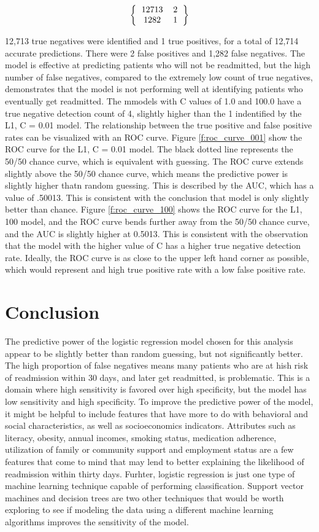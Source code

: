 \documentclass[sigconf]{acmart}
\begin{document}
\[ 
\left \{
  \begin{tabular}{ccc}
  12713 & 2 \\
  1282 & 1 
  \end{tabular}
\right \}
\]

12,713 true negatives were identified and 1 true positives, for a total of 12,714 accurate predictions. There were 2 false positives and 1,282 false negatives. The model is effective at predicting patients who will not be readmitted, but the high number of false negatives, compared to the extremely low count of true negatives, demonstrates that the model is not performing well at identifying patients who eventually get readmitted. The mmodels with C values of 1.0 and 100.0 have a true negative detection count of 4, slightly higher than the 1 indentified by the L1, C = 0.01 model.
The relationship between the true positive and false positive rates can be visualized with an ROC curve. Figure \ref{f:roc_curve_001} show the ROC curve for the L1, C = 0.01 model. The black dotted line represents the 50/50 chance curve, which is equivalent with guessing. The ROC curve extends slightly above the 50/50 chance curve, which means the predictive power is slightly higher thatn random guessing. This is described by the AUC, which has a value of .50013. This is consistent with the conclusion that model is only slightly better than chance. Figure \ref{f:roc_curve_100} shows the ROC curve for the L1, 100 model, and the ROC curve bends further away from the 50/50 chance curve, and the AUC is slightly higher at 0.5013. This is consistent with the observation that the model with the higher value of C has a higher true negative detection rate. Ideally, the ROC curve is as close to the upper left hand corner as possible, which would represent and high true positive rate with a low false positive rate.

\section{Conclusion}

The predictive power of the logistic regression model chosen for this analysis appear to be slightly better than random guessing, but not significantly better. The high proportion of false negatives means many patients who are at hish risk of readmission within 30 days, and later get readmitted, is problematic. This is a domain where high sensitivity is favored over high specificity, but the model has low sensitivity and high specificity. To improve the predictive power of the model, it might be helpful to include features that have more to do with behavioral and social characteristics, as well as socioeconomics indicators. Attributes such as literacy, obesity, annual incomes, smoking status, medication adherence, utilization of family or community support and employment status are a few features that come to mind that may lend to better explaining the likelihood of readmission within thirty days.
Furhter, logistic regression is just one type of machine learning technique capable of performing classification. Support vector machines and decision trees are two other techniques that would be worth exploring to see if modeling the data using a different machine learning algorithms improves the sensitivity of the model.
\end{document}
